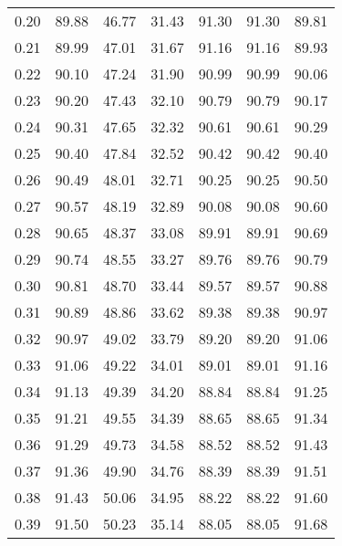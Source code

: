 \begin{tabular}{|c|c|c|c|c|c|c|}
      0.20 &     89.88 &     46.77 &      31.43 &   91.30 &      91.30 &         89.81 \\
      0.21 &     89.99 &     47.01 &      31.67 &   91.16 &      91.16 &         89.93 \\
      0.22 &     90.10 &     47.24 &      31.90 &   90.99 &      90.99 &         90.06 \\
      0.23 &     90.20 &     47.43 &      32.10 &   90.79 &      90.79 &         90.17 \\
      0.24 &     90.31 &     47.65 &      32.32 &   90.61 &      90.61 &         90.29 \\
      0.25 &     90.40 &     47.84 &      32.52 &   90.42 &      90.42 &         90.40 \\
      0.26 &     90.49 &     48.01 &      32.71 &   90.25 &      90.25 &         90.50 \\
      0.27 &     90.57 &     48.19 &      32.89 &   90.08 &      90.08 &         90.60 \\
      0.28 &     90.65 &     48.37 &      33.08 &   89.91 &      89.91 &         90.69 \\
      0.29 &     90.74 &     48.55 &      33.27 &   89.76 &      89.76 &         90.79 \\
      0.30 &     90.81 &     48.70 &      33.44 &   89.57 &      89.57 &         90.88 \\
      0.31 &     90.89 &     48.86 &      33.62 &   89.38 &      89.38 &         90.97 \\
      0.32 &     90.97 &     49.02 &      33.79 &   89.20 &      89.20 &         91.06 \\
      0.33 &     91.06 &     49.22 &      34.01 &   89.01 &      89.01 &         91.16 \\
      0.34 &     91.13 &     49.39 &      34.20 &   88.84 &      88.84 &         91.25 \\
      0.35 &     91.21 &     49.55 &      34.39 &   88.65 &      88.65 &         91.34 \\
      0.36 &     91.29 &     49.73 &      34.58 &   88.52 &      88.52 &         91.43 \\
      0.37 &     91.36 &     49.90 &      34.76 &   88.39 &      88.39 &         91.51 \\
      0.38 &     91.43 &     50.06 &      34.95 &   88.22 &      88.22 &         91.60 \\
      0.39 &     91.50 &     50.23 &      35.14 &   88.05 &      88.05 &         91.68 \\

\end{tabular}
